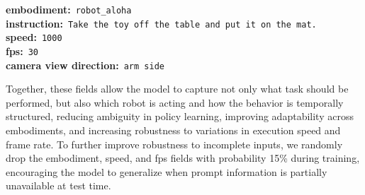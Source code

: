     



\begin{center}
\begin{tcolorbox}[
  width=0.72\linewidth,
  colback=gray!6!white,
  colframe=gray!50!black,
  colbacktitle=gray!40!black,
  coltitle=white,
  title={\small\bfseries Structured Embodiment Prompt Example},
  arc=5pt,
  boxrule=0.8pt,
  titlerule=0pt,
  left=8pt, right=8pt, top=6pt, bottom=6pt,
]
{\color{gray!60!black}\textbf{embodiment:}}~{\color{gray!60!black}\texttt{robot\_aloha}}\\[2pt]
{\color{gray!60!black}\textbf{instruction:}}~{\color{gray!60!black}\texttt{Take the toy off the table and put it on the mat.}}\\[2pt]
{\color{gray!60!black}\textbf{speed:}}~{\color{gray!60!black}\texttt{1000}}\\[2pt]
{\color{gray!60!black}\textbf{fps:}}~{\color{gray!60!black}\texttt{30}} \\[2pt]
{\color{gray!60!black}\textbf{camera view direction:}}~{\color{gray!60!black}\texttt{arm side}}
\end{tcolorbox}
\end{center}

Together, these fields allow the model to capture not only what task should be performed, but also which robot is acting and how the behavior is temporally structured, 
reducing ambiguity in policy learning, improving adaptability across embodiments, and increasing robustness to variations in execution speed and frame rate. 
To further improve robustness to incomplete inputs, we randomly drop the embodiment, speed, and fps fields with probability 15\% during training, encouraging the model to generalize when prompt information is partially unavailable at test time.






